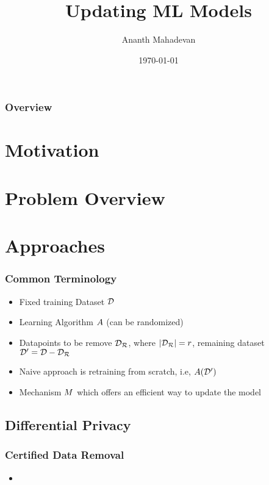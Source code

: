 \documentclass[pdf]{beamer}
\title{Updating ML Models}
\author[Ananth Mahadevan]{Ananth Mahadevan}
\date{\today}
\begin{document}
\begin{frame}
    \titlepage
\end{frame}

\begin{frame}
    \frametitle{Overview}
    \tableofcontents
\end{frame}

\section{Motivation}

\section{Problem Overview}

\section{Approaches}
\begin{frame}
  \frametitle{}
  \myNset[6]
  \smartart
\end{frame}

\begin{frame}
  \frametitle{Common Terminology}
  \begin{itemize}
    \item Fixed training Dataset $\mathcal{D}$
    \item Learning Algorithm $A$ (can be randomized)
    \item Datapoints to be remove $\mathcal{D_{R}}$, where $|\mathcal{D_{R}}|=r$, remaining dataset $\mathcal{D}^{\prime}=\mathcal{D} - \mathcal{D_{R}}$
    \item Naive approach is retraining from scratch, i.e, $A(\mathcal{D}^{\prime})$
    \item Mechanism $M$ which offers an efficient way to update the model
  \end{itemize}
\end{frame}

\subsection{Differential Privacy}
\begin{frame}
  \myNset[1]
  \smartart
\end{frame}

\begin{frame}
  \frametitle{Certified Data Removal \cite{guoCertifiedDataRemoval2020}}
  \begin{itemize}
    \item 
  \end{itemize}
\end{frame}
\end{document}

